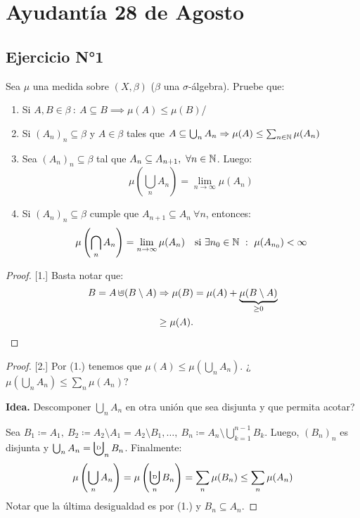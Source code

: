 \section{Ayudantía 28 de Agosto}

\subsection*{Ejercicio N°1}

\noindent Sea $\mu$ una medida sobre $(X, \beta)$ ($\beta$ una $\sigma$-álgebra). Pruebe que:

\begin{enumerate}
	\item Si $A,B \in \beta \ : \ A \subseteq B \implies  \mu(A) \leq \mu(B)$/
	
	\item Si $(A_n)_n \subseteq \beta$ y $A \in \beta$ tales que $A \subseteq \bigcup_{n} A_n \Rightarrow \mu(A) \leq \sum_{n\in\mathbb{N}} \mu(A_n)$

	\item Sea $(A_n)_n \subseteq \beta$ tal que $A_n \subseteq A_{n+1},\ \forall n \in \mathbb{N}$. Luego:
	\[ \mu\left( \bigcup_{n} A_n \right) = \lim_{n \to \infty} \mu(A_n) \]

	\item Si $(A_n)_n \subseteq \beta$ cumple que $A_{n+1} \subseteq A_n \ \forall n$, entonces:
	\[ \mu \left( \bigcap_{n} A_n \right) = \lim_{n \to \infty} \mu(A_n) \quad \text{si } \exists n_0 \in \mathbb{N} \ : \ \mu(A_{n_0}) < \infty \]
\end{enumerate}

\begin{proof}[Proof][1.]
	Basta notar que:
	\begin{align*}
		B = A \cupd (B \setminus A) & \implies \mu(B) = \mu(A) + \underbrace{\mu(B\setminus A)}_{\geq 0} \\
		& \geq \mu(A)
	.\end{align*}
\end{proof}

\begin{proof}[Proof][2.]
	Por (1.) tenemos que $\mu(A) \leq \mu\left( \bigcup_{n} A_n \right)$. ¿$\mu\left(\bigcup_{n}A_n\right) \leq \sum_{n} \mu(A_n)$?\newline

	\noindent \textbf{Idea.} Descomponer $\bigcup_{n} A_n$ en otra unión que sea disjunta y que permita acotar? \newline

	\noindent Sea $B_1 \coloneq A_1,\ B_2 \coloneq A_2 \setminus A_1 = A_2 \setminus B_1,\dots,\ B_n \coloneq A_n \setminus \bigcup_{k=1}^{n-1} B_k$. Luego, $(B_n)_n$ es disjunta y $\bigcup_{n} A_n = \bigcupd_{n} B_n$. Finalmente:
	\[ \mu \left( \bigcup_{n} A_n \right) = \mu \left( \bigcupd_{n} B_n \right) = \sum_{n} \mu(B_n) \leq \sum_{n} \mu(A_n) \]
	Notar que la última desigualdad es por (1.) y $B_n \subseteq A_n$.
\end{proof}

